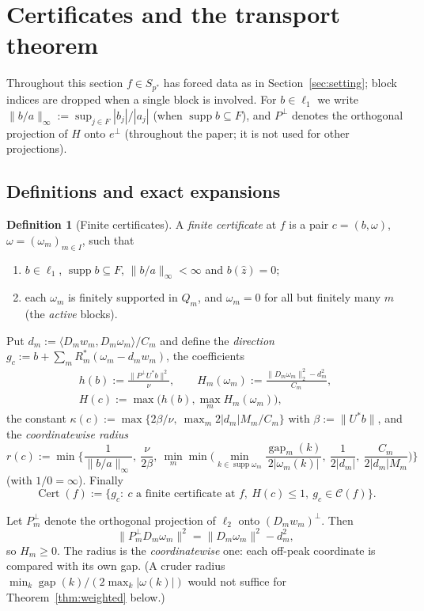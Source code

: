 \documentclass[10pt]{amsart}
\theoremstyle{definition}
\newtheorem{definition}[theorem]{Definition}
\theoremstyle{remark}
\newcommand{\supp}{\operatorname{supp}}
\newcommand{\Cset}{\mathcal C}
\newcommand{\Cert}{\operatorname{Cert}}
\newcommand{\gap}{\operatorname{gap}}
\newcommand{\zh}{\hat z}
\newcommand{\ip}[2]{\langle #1,#2\rangle}
\begin{document}
\section{Certificates and the transport theorem}\label{sec:certificates}

Throughout this section $f\in S_{p^*}$ has forced data as in
Section~\ref{sec:setting}; block indices are dropped when a single block is
involved.  For $b\in\ell_1$ we write $\|b/a\|_\infty:=\sup_{j\in F}|b_j|/|a_j|$
(when $\supp b\subseteq F$), and $P^\perp$ denotes the orthogonal projection
of $H$ onto $e^\perp$ (throughout the paper; it is not used for other
projections).

\subsection{Definitions and exact expansions}

\begin{definition}[Finite certificates]\label{def:certificate}
A \emph{finite certificate} at $f$ is a pair $c=(b,\omega)$,
$\omega=(\omega_m)_{m\in I}$, such that
\begin{enumerate}
\item[(C1)] $b\in\ell_1$, $\supp b\subseteq F$, $\|b/a\|_\infty<\infty$ and
$b(\zh)=0$;
\item[(C2)] each $\omega_m$ is finitely supported in $Q_m$, and
$\omega_m=0$ for all but finitely many $m$ (the \emph{active} blocks).
\end{enumerate}
Put $d_m:=\ip{D_mw_m}{D_m\omega_m}/C_m$ and define the \emph{direction}
$g_c:=b+\sum_mR_m^*(\omega_m-d_mw_m)$, the coefficients
\begin{gather*}
 h(b):=\frac{\|P^\perp U^*b\|^2}{\nu},\qquad
 H_m(\omega_m):=\frac{\|D_m\omega_m\|_2^2-d_m^2}{C_m},\\
 H(c):=\max\big(h(b),\max_mH_m(\omega_m)\big),
\end{gather*}
the constant $\kappa(c):=\max\{2\beta/\nu,\ \max_m2|d_m|M_m/C_m\}$ with
$\beta:=\|U^*b\|$, and the \emph{coordinatewise radius}
\[
 r(c):=\min\Big\{\frac1{\|b/a\|_\infty},\ \frac\nu{2\beta},\
 \min_m\min\Big(\min_{k\in\supp\omega_m}\frac{\gap_m(k)}{2|\omega_m(k)|},\
 \frac1{2|d_m|},\ \frac{C_m}{2|d_m|M_m}\Big)\Big\}
\]
(with $1/0=\infty$).  Finally
\[
 \Cert(f):=\{g_c:\ c\text{ a finite certificate at }f,\ H(c)\le1,\ g_c\in\Cset(f)\}.
\]
\end{definition}

Let $P_m^\perp$ denote the orthogonal projection of $\ell_2$ onto
$(D_mw_m)^\perp$.  Then
\[
 \|P_m^\perp D_m\omega_m\|^2=\|D_m\omega_m\|^2-d_m^2,
\]
so $H_m\ge0$.  The radius is the
\emph{coordinatewise} one: each off-peak coordinate is compared with its own
gap.  (A cruder radius $\min_k\gap(k)/(2\max_k|\omega(k)|)$ would not suffice
for Theorem~\ref{thm:weighted} below.)
\end{document}
